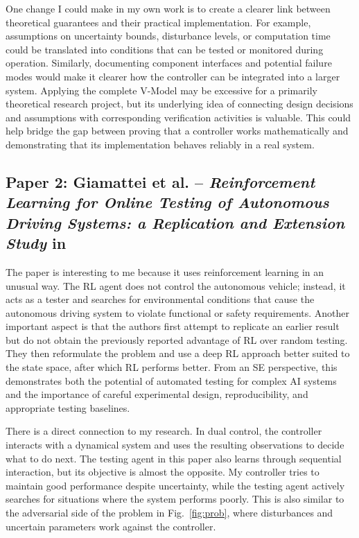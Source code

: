 \documentclass[11pt,a4paper]{article}
\begin{document}
One change I could make in my own work is to create a clearer link between theoretical guarantees and their practical implementation. For example, assumptions on uncertainty bounds, disturbance levels, or computation time could be translated into conditions that can be tested or monitored during operation. Similarly, documenting component interfaces and potential failure modes would make it clearer how the controller can be integrated into a larger system. Applying the complete V-Model may be excessive for a primarily theoretical research project, but its underlying idea of connecting design decisions and assumptions with corresponding verification activities is valuable. This could help bridge the gap between proving that a controller works mathematically and demonstrating that its implementation behaves reliably in a real system.


\subsection{Paper 2: Giamattei et al. -- \emph{Reinforcement Learning for Online Testing of Autonomous Driving Systems: a Replication and Extension Study} in \cite{giamattei2025reinforcement}}

The paper is interesting to me because it uses reinforcement learning in an unusual way. The RL agent does not control the autonomous vehicle; instead, it acts as a tester and searches for environmental conditions that cause the autonomous driving system to violate functional or safety requirements. Another important aspect is that the authors first attempt to replicate an earlier result but do not obtain the previously reported advantage of RL over random testing. They then reformulate the problem and use a deep RL approach better suited to the state space, after which RL performs better. From an SE perspective, this demonstrates both the potential of automated testing for complex AI systems and the importance of careful experimental design, reproducibility, and appropriate testing baselines.

There is a direct connection to my research. In dual control, the controller interacts with a dynamical system and uses the resulting observations to decide what to do next. The testing agent in this paper also learns through sequential interaction, but its objective is almost the opposite. My controller tries to maintain good performance despite uncertainty, while the testing agent actively searches for situations where the system performs poorly. This is also similar to the adversarial side of the problem in Fig.~\ref{fig:prob}, where disturbances and uncertain parameters work against the controller.
\end{document}
